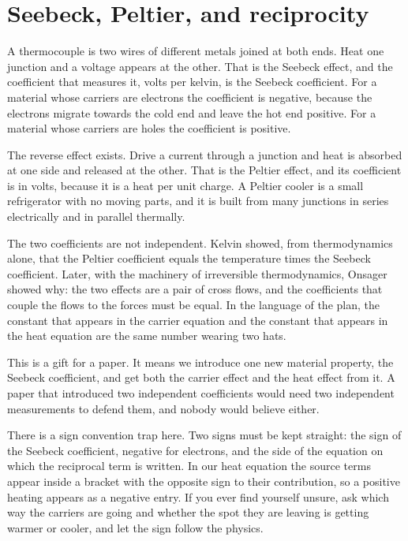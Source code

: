 \documentclass[11pt]{article}
\begin{document}
\section{Seebeck, Peltier, and reciprocity}

A thermocouple is two wires of different metals joined at both ends. Heat one junction and a voltage appears
at the other. That is the Seebeck effect, and the coefficient that measures it, volts per kelvin, is the
Seebeck coefficient. For a material whose carriers are electrons the coefficient is negative, because the
electrons migrate towards the cold end and leave the hot end positive. For a material whose carriers are
holes the coefficient is positive.

The reverse effect exists. Drive a current through a junction and heat is absorbed at one side and released
at the other. That is the Peltier effect, and its coefficient is in volts, because it is a heat per unit
charge. A Peltier cooler is a small refrigerator with no moving parts, and it is built from many junctions in
series electrically and in parallel thermally.

The two coefficients are not independent. Kelvin showed, from thermodynamics alone, that the Peltier
coefficient equals the temperature times the Seebeck coefficient. Later, with the machinery of irreversible
thermodynamics, Onsager showed why: the two effects are a pair of cross flows, and the coefficients that
couple the flows to the forces must be equal. In the language of the plan, the constant that appears in the
carrier equation and the constant that appears in the heat equation are the same number wearing two hats.

This is a gift for a paper. It means we introduce one new material property, the Seebeck coefficient, and get
both the carrier effect and the heat effect from it. A paper that introduced two independent coefficients
would need two independent measurements to defend them, and nobody would believe either.

There is a sign convention trap here. Two
signs must be kept straight: the sign of the Seebeck coefficient, negative for electrons, and the side of the
equation on which the reciprocal term is written. In our heat equation the source terms appear inside a
bracket with the opposite sign to their contribution, so a positive heating appears as a negative entry. If you ever find yourself unsure, ask which way the carriers are
going and whether the spot they are leaving is getting warmer or cooler, and let the sign follow the physics.
\end{document}
